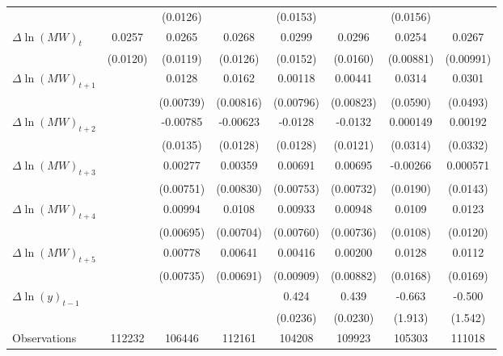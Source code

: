 {\begin{tabular}{l*{7}{c}}
          &                  & (0.0126)         &                  & (0.0153)         &                  & (0.0156)         &                  \\
[1em]
$\Delta \ln(MW)_{t}$&   0.0257\sym{**} &   0.0265\sym{**} &   0.0268\sym{**} &   0.0299\sym{*}  &   0.0296\sym{*}  &   0.0254\sym{***}&   0.0267\sym{**} \\
          & (0.0120)         & (0.0119)         & (0.0126)         & (0.0152)         & (0.0160)         &(0.00881)         &(0.00991)         \\
[1em]
$\Delta \ln(MW)_{t+1}$&                  &   0.0128\sym{*}  &   0.0162\sym{*}  &  0.00118         &  0.00441         &   0.0314         &   0.0301         \\
          &                  &(0.00739)         &(0.00816)         &(0.00796)         &(0.00823)         & (0.0590)         & (0.0493)         \\
[1em]
$\Delta \ln(MW)_{t+2}$&                  & -0.00785         & -0.00623         &  -0.0128         &  -0.0132         & 0.000149         &  0.00192         \\
          &                  & (0.0135)         & (0.0128)         & (0.0128)         & (0.0121)         & (0.0314)         & (0.0332)         \\
[1em]
$\Delta \ln(MW)_{t+3}$&                  &  0.00277         &  0.00359         &  0.00691         &  0.00695         & -0.00266         & 0.000571         \\
          &                  &(0.00751)         &(0.00830)         &(0.00753)         &(0.00732)         & (0.0190)         & (0.0143)         \\
[1em]
$\Delta \ln(MW)_{t+4}$&                  &  0.00994         &   0.0108         &  0.00933         &  0.00948         &   0.0109         &   0.0123         \\
          &                  &(0.00695)         &(0.00704)         &(0.00760)         &(0.00736)         & (0.0108)         & (0.0120)         \\
[1em]
$\Delta \ln(MW)_{t+5}$&                  &  0.00778         &  0.00641         &  0.00416         &  0.00200         &   0.0128         &   0.0112         \\
          &                  &(0.00735)         &(0.00691)         &(0.00909)         &(0.00882)         & (0.0168)         & (0.0169)         \\
[1em]
$\Delta \ln(y)_{t-1}$&                  &                  &                  &    0.424\sym{***}&    0.439\sym{***}&   -0.663         &   -0.500         \\
          &                  &                  &                  & (0.0236)         & (0.0230)         &  (1.913)         &  (1.542)         \\
\hline
Observations&   112232         &   106446         &   112161         &   104208         &   109923         &   105303         &   111018         \\
\hline\hline
\end{tabular}
}
